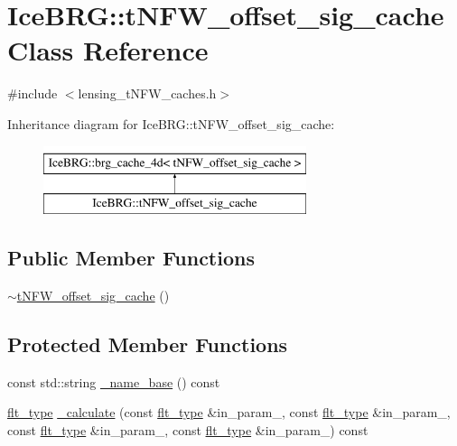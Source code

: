\hypertarget{classIceBRG_1_1tNFW__offset__sig__cache}{}\section{Ice\+B\+R\+G\+:\+:t\+N\+F\+W\+\_\+offset\+\_\+sig\+\_\+cache Class Reference}
\label{classIceBRG_1_1tNFW__offset__sig__cache}


{\ttfamily \#include $<$lensing\+\_\+t\+N\+F\+W\+\_\+caches.\+h$>$}

Inheritance diagram for Ice\+B\+R\+G\+:\+:t\+N\+F\+W\+\_\+offset\+\_\+sig\+\_\+cache\+:\begin{figure}[H]
\begin{center}
\leavevmode
\includegraphics[height=2.000000cm]{classIceBRG_1_1tNFW__offset__sig__cache}
\end{center}
\end{figure}
\subsection*{Public Member Functions}
\begin{DoxyCompactItemize}
\item 
\hyperlink{classIceBRG_1_1tNFW__offset__sig__cache_ae6477deb6a2e6449d4cce2a92053fc69}{$\sim$t\+N\+F\+W\+\_\+offset\+\_\+sig\+\_\+cache} ()
\end{DoxyCompactItemize}
\subsection*{Protected Member Functions}
\begin{DoxyCompactItemize}
\item 
const std\+::string \hyperlink{classIceBRG_1_1tNFW__offset__sig__cache_a93e0baf8668ed0e6f420e64ce5b0d105}{\+\_\+name\+\_\+base} () const 
\item 
\hyperlink{lib_2IceBRG__main_2common_8h_ad0f130a56eeb944d9ef2692ee881ecc4}{flt\+\_\+type} \hyperlink{classIceBRG_1_1tNFW__offset__sig__cache_a724eb5a7817521a54fbe7e7e01db1ac0}{\+\_\+calculate} (const \hyperlink{lib_2IceBRG__main_2common_8h_ad0f130a56eeb944d9ef2692ee881ecc4}{flt\+\_\+type} \&in\+\_\+param\+\_, const \hyperlink{lib_2IceBRG__main_2common_8h_ad0f130a56eeb944d9ef2692ee881ecc4}{flt\+\_\+type} \&in\+\_\+param\+\_, const \hyperlink{lib_2IceBRG__main_2common_8h_ad0f130a56eeb944d9ef2692ee881ecc4}{flt\+\_\+type} \&in\+\_\+param\+\_, const \hyperlink{lib_2IceBRG__main_2common_8h_ad0f130a56eeb944d9ef2692ee881ecc4}{flt\+\_\+type} \&in\+\_\+param\+\_) const 
\end{DoxyCompactItemize}
